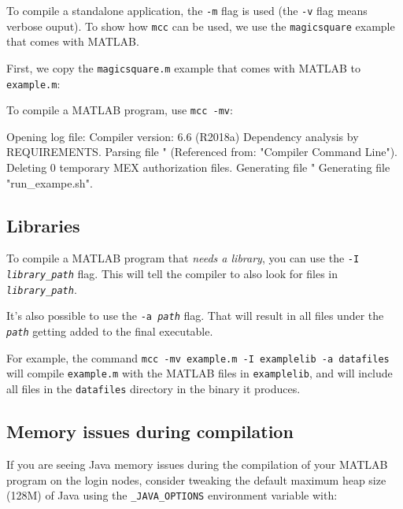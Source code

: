 To compile a standalone application, the \lstinline|-m|
flag is used (the \lstinline|-v| flag means verbose ouput).
To show how \lstinline|mcc| can be used, we use the \lstinline|magicsquare| example
that comes with MATLAB.

First, we copy the \lstinline|magicsquare.m| example that comes with MATLAB to \lstinline|example.m|:

\begin{prompt}
\end{prompt}

To compile a MATLAB program, use \lstinline|mcc -mv|:

\begin{prompt}
Opening log file:  %
Compiler version: 6.6 (R2018a)
Dependency analysis by REQUIREMENTS.
Parsing file "%
	(Referenced from: "Compiler Command Line").
Deleting 0 temporary MEX authorization files.
Generating file "%
Generating file "run\_exampe.sh".
\end{prompt}

\subsection{Libraries}

To compile a MATLAB program that \emph{needs a library}, you can use the
\texttt{-I \emph{library\_path}} flag. This will tell the compiler to also
look for files in \texttt{\emph{library\_path}}.

It's also possible to use the \texttt{-a \emph{path}} flag. That will result in
all files under the \texttt{\emph{path}} getting added to the final executable.

For example, the command \lstinline|mcc -mv example.m -I examplelib -a datafiles| will
compile \lstinline|example.m| with the MATLAB files in \lstinline|examplelib|, and will
include all files in the \lstinline|datafiles| directory in the binary it produces.

\subsection{Memory issues during compilation}

If you are seeing Java memory issues during the compilation of your MATLAB program
on the login nodes, consider tweaking the default maximum heap size (128M) of Java
using the \lstinline|_JAVA_OPTIONS| environment variable with:

